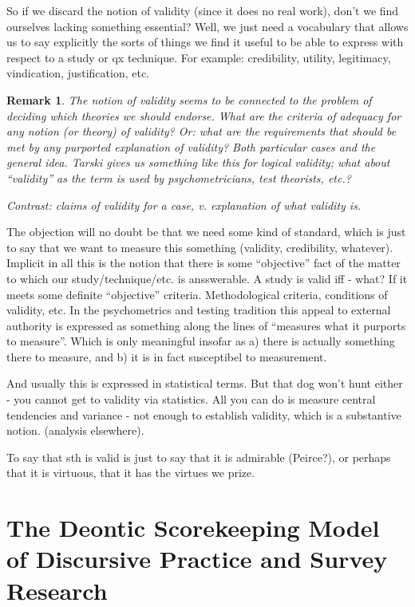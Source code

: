 \documentclass[11pt,twoside]{article}
\newtheorem{remark}{Remark}
\newcommand{\SR}{Survey Research}
\begin{document}
So if we discard the notion of validity (since it does no real work),
don't we find ourselves lacking something essential?  Well, we just
need a vocabulary that allows us to say explicitly the sorts of things
we find it useful to be able to express with respect to a study or qx
technique.  For example: credibility, utility, legitimacy,
vindication, justification, etc.

\begin{remark}
  The notion of validity seems to be connected to the problem of
  deciding which theories we should endorse.  What are the criteria of
  adequacy for any notion (or theory) of validity?  Or: what are the
  requirements that should be met by any purported explanation of
  validity?  Both particular cases and the general idea.  Tarski gives
  us something like this for logical validity; what about ``validity''
  as the term is used by psychometricians, test theorists, etc.?

Contrast: claims of validity for a case, v. explanation of what
validity is.


\end{remark}

The objection will no doubt be that we need some kind of standard,
which is just to say that we want to measure this something (validity,
credibility, whatever).  Implicit in all this is the notion that there
is some ``objective'' fact of the matter to which our
study/technique/etc. is ansswerable. A study is valid iff - what?  If
it meets some definite ``objective'' criteria.  Methodological
criteria, conditions of validity, etc.  In the psychometrics and
testing tradition this appeal to external authority is expressed as
something along the lines of ``measures what it purports to measure''.
Which is only meaningful insofar as a) there is actually something
there to measure, and b) it is in fact susceptibel to measurement.

And usually this is expressed in statistical terms.  But that dog
won't hunt either - you cannot get to validity via statistics.  All
you can do is measure central tendencies and variance - not enough to
establish validity, which is a substantive notion. (analysis
elsewhere).

To say that sth is valid is just to say that it is admirable
(Peirce?), or perhaps that it is virtuous, that it has the virtues we
prize.

\section{The Deontic Scorekeeping Model of Discursive Practice and \SR{}}
\end{document}
